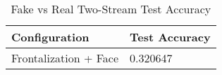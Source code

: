 \begin{table}[H] \centering

\makeatletter
\def\rulecolor#1#{\CT@arc{#1}}
\def\CT@arc#1#2{%
\ifdim\baselineskip=\z@\noalign\fi
{\gdef\CT@arc@{\color#1{#2}}}}
\let\CT@arc@\relax
{}
\makeatother

\begin{tabular}{@{}l|l@{}}
	\toprule
    Configuration & Test Accuracy \\
    
    \midrule
    Frontalization + Face & 0.320647 \\
    
    \bottomrule
\end{tabular}
    
	\caption{Fake vs Real Two-Stream Test Accuracy} 
    \label{table:fake-fakereal_fuse}

\end{table}